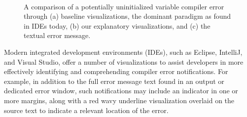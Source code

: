 \documentclass[conference]{IEEEtran}
\begin{document}
\begin{figure}[!t]
  \\
  \caption{A comparison of a potentially uninitialized variable compiler error through (a) baseline visualizations, the dominant paradigm as found in IDEs today, (b) our explanatory visualizations, and (c) the textual error message.\label{fig:melon}}
\end{figure}

Modern integrated development environments (IDEs), such as Eclipse, IntelliJ, and Visual Studio, offer a number of visualizations to assist developers in more effectively identifying and comprehending compiler error notifications. For example, in addition to the full error message text found in an output or dedicated error window, such notifications may include an indicator in one or more margins, along with a red wavy underline visualization overlaid on the source text to indicate a relevant location of the error.
\end{document}
